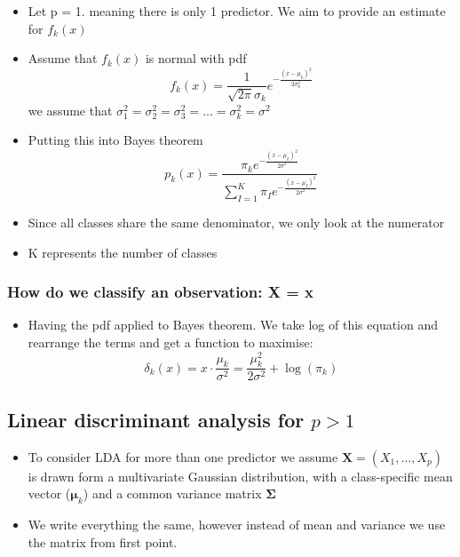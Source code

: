 \documentclass{article}
\begin{document}
\begin{itemize}
    \item Let p = 1. meaning there is only 1 predictor. We aim to provide an estimate for $f_k(x)$
    \item Assume that $f_k(x)$ is normal with pdf
    \begin{equation*}
        f_k(x) = \frac{1}{\sqrt{2\pi} \sigma_k} e^{- \frac{(x - \mu_k)^2}{2\sigma^2_k}}
    \end{equation*}
    we assume that $\sigma^2_1 = \sigma_2^2 = \sigma^2_3 = ... = \sigma^2_k = \sigma^2$
    \item Putting this into Bayes theorem
    \begin{equation*}
        p_k(x) = \frac{\pi_k e^{- \frac{(x - \mu_k)^2}{2\sigma^2}}}{\sum_{I=1}^K \pi_I e^{- \frac{(x - \mu_I)^2}{2\sigma^2}}}
    \end{equation*}
    \item Since all classes share the same denominator, we only look at the numerator
    \item K represents the number of classes
\end{itemize}

\subsubsection{How do we classify an observation: X = x}
\begin{itemize}
    \item Having the pdf applied to Bayes theorem. We take log of this equation and rearrange the terms and get a function to maximise:
    \begin{equation*}
        \delta_k(x) = x \cdot \frac{\mu_k}{\sigma^2} = \frac{\mu_k^2}{2 \sigma^2} + \log(\pi_k)
    \end{equation*}
\end{itemize}


\subsection{Linear discriminant analysis for $p > 1$}

\begin{itemize}
    \item To consider LDA for more than one predictor we assume $\mathbf{X} = (X_1, ..., X_p)$ is drawn form a multivariate Gaussian distribution, with a class-specific mean vector ($\mathbf{\mu}_k$) and a common variance matrix $\mathbf{\Sigma}$
    \item We write everything the same, however instead of mean and variance we use the matrix from first point.
\end{itemize}
\end{document}
